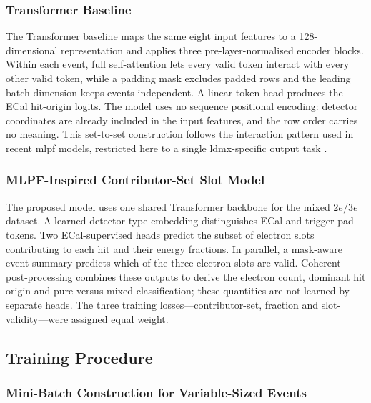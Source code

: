 

\subsubsection{Transformer Baseline}

The Transformer baseline maps the same eight input features to a
128-dimensional representation and applies three pre-layer-normalised
encoder blocks. Within each event, full self-attention lets every valid token
interact with every other valid token, while a padding mask excludes padded
rows and the leading batch dimension keeps events independent. A linear token
head produces the ECal hit-origin logits. The model uses no sequence
positional encoding: detector coordinates are already included in the input
features, and the row order carries no meaning. This
set-to-set construction follows the interaction pattern used in recent
\gls{mlpf} models, restricted here to a single \gls{ldmx}-specific output task
\cite{pata2026-mlpf}.



\subsubsection{MLPF-Inspired Contributor-Set Slot Model}

The proposed model uses one shared Transformer backbone for the mixed
\(2e/3e\) dataset. A learned detector-type embedding distinguishes ECal and
trigger-pad tokens. Two ECal-supervised heads predict the subset of electron
slots contributing to each hit and their energy fractions. In parallel, a
mask-aware event summary predicts which of the three electron slots are
valid. Coherent post-processing combines these outputs to derive the electron
count, dominant hit origin and pure-versus-mixed classification; these
quantities are not learned by separate heads. The three training losses---contributor-set,
fraction and slot-validity---were assigned equal weight.



\subsection{Training Procedure}

\subsubsection{Mini-Batch Construction for Variable-Sized Events}
\label{sec:method_batching}

